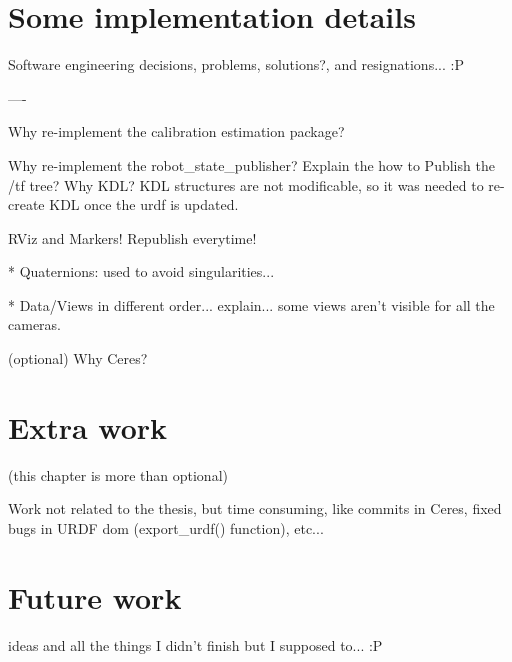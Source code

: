 \chapter{Some implementation details}
\label{cha:implementation}

Software engineering decisions, problems, solutions?, and resignations... :P


----

Why re-implement the calibration estimation package?

Why re-implement the robot\_state\_publisher? Explain the how to Publish the /tf tree?
Why KDL? KDL structures are not modificable, so it was needed to re-create KDL once the urdf is updated.

RViz and Markers! Republish everytime!

* Quaternions: used to avoid singularities...

* Data/Views in different order... explain... some views aren't visible for all the cameras.

(optional)
Why Ceres?




\chapter{Extra work}
\label{cha:extra}

(this chapter is more than optional)

Work not related to the thesis, but time consuming, like commits in Ceres, fixed bugs in URDF dom (export\_urdf() function), etc...



\chapter{Future work}
\label{cha:future}

ideas and all the things I didn't finish but I supposed to... :P
